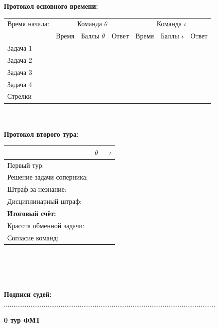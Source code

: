 \documentclass[12pt]{article}
\begin{document}
\begin{center}{\bf Протокол основного времени: } \\ 
\begin{tabular}{|p{3.3cm}|p{1.5cm}|p{2cm}|p{1.5cm}|p{1.5cm}|p{2cm}|p{1.5cm}|}
\hline Время начала: & \multicolumn{3}{c|}{Команда $\theta$} & \multicolumn{3}{c|}{Команда $\iota$ }\\\cline{2-7} {} & Время & Баллы $\theta$ & Ответ & Время & Баллы $\iota$ & Ответ \\\hline \hline \center Задача 1 &{}&{}&{}&{}&{}&{}\\[20mm]\hline \hline \center Задача 2 &{}&{}&{}&{}&{}&{}\\[20mm]\hline \hline \center Задача 3 &{}&{}&{}&{}&{}&{}\\[20mm]\hline \hline \center Задача 4 &{}&{}&{}&{}&{}&{}\\[20mm]\hline \hline \center Стрелки &{}&{}&{}&{}&{}&{}\\[20mm]\hline
\end{tabular}
$ $\\
$ $\\
{\bf Протокол второго тура: } \\ 
\begin{tabular}{ | p{7cm} | p{1cm} | p{1cm} |}
\hline
$ $ & \centering $\theta$ & $\;$ $\iota$ \\ \hline\raggedleft Первый тур: & & \\ \hline\raggedleft Решение задачи соперника: & & \\ \hline\raggedleft Штраф за незнание: & & \\ \hline\raggedleft Дисциплинарный штраф: & & \\ \hline\raggedleft \bf Итоговый счёт: & & \\ \hline \hline\raggedleft Красота обменной задачи: & & \\ \hline\raggedleft Согласие команд: & & \\ \hline\end{tabular}\end{center}
$ $\\
$ $\\
$ $\\
$ $\\
{\bf Подписи судей: }................................................................................................................\newpage
\begin{center}
{\Huge \bf 0 тур ФМТ}
\end{center}
\end{document}
